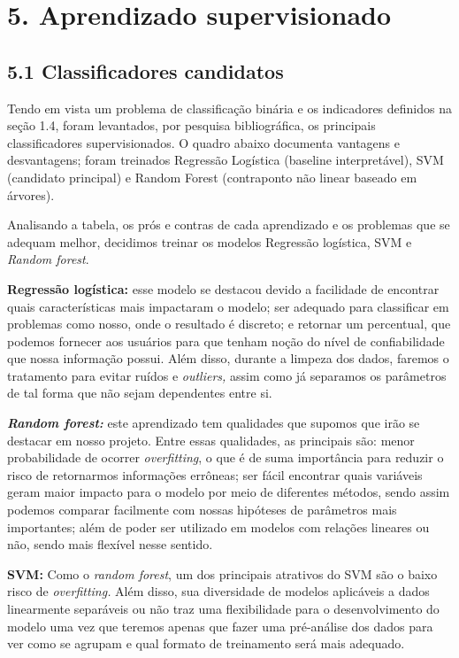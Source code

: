 \documentclass[
  brazilian,
  11pt,
]{article}
\begin{document}
\section{5. Aprendizado supervisionado}\label{aprendizado-supervisionado}

\subsection{5.1 Classificadores candidatos}\label{classificadores-candidatos}

Tendo em vista um problema de classificação binária e os indicadores definidos na seção 1.4, foram levantados, por pesquisa bibliográfica, os principais classificadores supervisionados. O quadro abaixo documenta vantagens e desvantagens; foram treinados Regressão Logística (baseline interpretável), SVM (candidato principal) e Random Forest (contraponto não linear baseado em árvores).

Analisando a tabela, os prós e contras de cada aprendizado e os problemas que se adequam melhor, decidimos treinar os modelos Regressão logística, SVM e \emph{Random forest}.

\textbf{Regressão logística:} esse modelo se destacou devido a facilidade de encontrar quais características mais impactaram o modelo; ser adequado para classificar em problemas como nosso, onde o resultado é discreto; e retornar um percentual, que podemos fornecer aos usuários para que tenham noção do nível de confiabilidade que nossa informação possui. Além disso, durante a limpeza dos dados, faremos o tratamento para evitar ruídos e \emph{outliers,} assim como já separamos os parâmetros de tal forma que não sejam dependentes entre si.

\textbf{\emph{Random forest:}} este aprendizado tem qualidades que supomos que irão se destacar em nosso projeto. Entre essas qualidades, as principais são: menor probabilidade de ocorrer \emph{overfitting}, o que é de suma importância para reduzir o risco de retornarmos informações errôneas; ser fácil encontrar quais variáveis geram maior impacto para o modelo por meio de diferentes métodos, sendo assim podemos comparar facilmente com nossas hipóteses de parâmetros mais importantes; além de poder ser utilizado em modelos com relações lineares ou não, sendo mais flexível nesse sentido.

\textbf{SVM:} Como o \emph{random forest}, um dos principais atrativos do SVM são o baixo risco de \emph{overfitting.} Além disso, sua diversidade de modelos aplicáveis a dados linearmente separáveis ou não traz uma flexibilidade para o desenvolvimento do modelo uma vez que teremos apenas que fazer uma pré-análise dos dados para ver como se agrupam e qual formato de treinamento será mais adequado.
\end{document}
